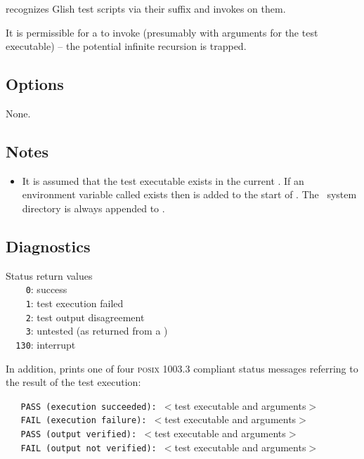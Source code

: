  recognizes Glish test scripts via their  suffix and
invokes  on them.

It is permissible for a  to invoke  (presumably with
arguments for the test executable) -- the potential infinite recursion is
trapped.
 
\subsection*{Options}
 
None.
 
\subsection*{Notes}
 
\begin{itemize}
\item
   It is assumed that the test executable exists in the current .
   If an environment variable called  exists then
    is added to the start of .  The \aipspp\
   system  directory is always appended to .
\end{itemize}

\subsection*{Diagnostics}
 
Status return values
\\ \verb+    0+: success
\\ \verb+    1+: test execution failed
\\ \verb+    2+: test output disagreement
\\ \verb+    3+: untested (as returned from a )
\\ \verb+  130+: interrupt

\noindent
In addition,  prints one of four \textsc{posix 1003.3} compliant
status messages referring to the result of the test execution:

\noindent
\verb+   PASS (execution succeeded): +$<$test executable and arguments$>$ \\
\verb+   FAIL (execution failure): +$<$test executable and arguments$>$ \\
\verb+   PASS (output verified): +$<$test executable and arguments$>$ \\
\verb+   FAIL (output not verified): +$<$test executable and arguments$>$
 
